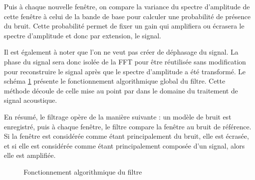 \documentclass[letterpaper, twoside, 12pt, memoire, creativecommons, hyperref]{thETS}
\begin{document}
Puis à chaque nouvelle fenêtre, on compare la variance du spectre d'amplitude de cette fenêtre à celui de la bande de base pour calculer une probabilité de présence du bruit. Cette probabilité permet de fixer un gain qui amplifiera ou écrasera le spectre d'amplitude et donc par extension, le signal.

Il est également à noter que l'on ne veut pas créer de déphasage du signal. La phase du signal sera donc isolée de la FFT pour être réutilisée sans modification pour reconstruire le signal après que le spectre d'amplitude a été transformé. Le schéma \ref{fig:filtre} présente le fonctionnement algorithmique global du filtre. Cette méthode découle de celle mise au point par \cite{plapous2006} dans le domaine du traitement de signal acoustique.

En résumé, le filtrage opère de la manière suivante : un modèle de bruit est enregistré, puis à chaque fenêtre, le filtre compare la fenêtre au bruit de référence. Si la fenêtre est considérée comme étant principalement du bruit, elle est écrasée, et si elle est considérée comme étant principalement composée d'un signal, alors elle est amplifiée.

\begin{figure}
	\centering
	\caption{Fonctionnement algorithmique du filtre}
	\label{fig:filtre}
\end{figure}
\end{document}

